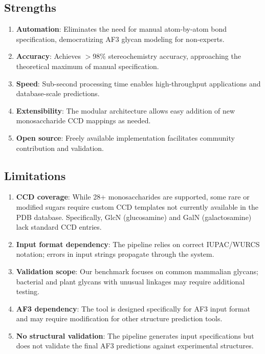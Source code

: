 
\subsection{Strengths}

\begin{enumerate}
\item \textbf{Automation}: Eliminates the need for manual atom-by-atom bond specification, democratizing AF3 glycan modeling for non-experts.

\item \textbf{Accuracy}: Achieves $>$98\% stereochemistry accuracy, approaching the theoretical maximum of manual specification.

\item \textbf{Speed}: Sub-second processing time enables high-throughput applications and database-scale predictions.

\item \textbf{Extensibility}: The modular architecture allows easy addition of new monosaccharide CCD mappings as needed.

\item \textbf{Open source}: Freely available implementation facilitates community contribution and validation.
\end{enumerate}

\subsection{Limitations}

\begin{enumerate}
\item \textbf{CCD coverage}: While 28+ monosaccharides are supported, some rare or modified sugars require custom CCD templates not currently available in the PDB database. Specifically, GlcN (glucosamine) and GalN (galactosamine) lack standard CCD entries.

\item \textbf{Input format dependency}: The pipeline relies on correct IUPAC/WURCS notation; errors in input strings propagate through the system.

\item \textbf{Validation scope}: Our benchmark focuses on common mammalian glycans; bacterial and plant glycans with unusual linkages may require additional testing.

\item \textbf{AF3 dependency}: The tool is designed specifically for AF3 input format and may require modification for other structure prediction tools.

\item \textbf{No structural validation}: The pipeline generates input specifications but does not validate the final AF3 predictions against experimental structures.
\end{enumerate}

